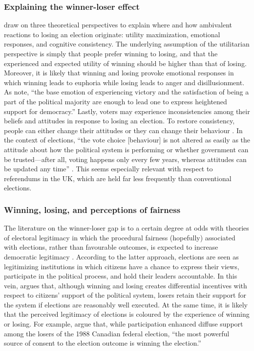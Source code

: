 \documentclass[12pt, letter]{article}
\begin{document}
\subsubsection{Explaining the winner-loser effect}
\textcite{anderson2005losers} draw on three theoretical perspectives to explain where and how ambivalent reactions to losing an election originate: utility maximization, emotional responses, and cognitive consistency. The underlying assumption of the utilitarian perspective is simply that people prefer winning to losing, and that the experienced and expected utility of winning should be higher than that of losing. Moreover, it is likely that winning and losing provoke emotional responses in which winning leads to euphoria while losing leads to anger and disillusionment. As \parencite[697]{singh2011winning} note, ``the base emotion of experiencing victory and the satisfaction of being a part of the political majority are enough to lead one to express heightened support for democracy.''  Lastly, voters may experience inconsistencies among their beliefs and attitudes in response to losing an election. To restore consistency, people can either change their attitudes or they can change their behaviour \parencite{festinger1957theory}. In the context of elections, ``the vote choice [behaviour] is not altered as easily as the attitude about how the political system is performing or whether government can be trusted---after all, voting happens only every few years, whereas attitudes can be updated any time'' \parencite[27]{anderson2005losers}. This seems especially relevant with respect to referendums in the UK, which are held far less frequently than conventional elections. 

\subsubsection{Winning, losing, and perceptions of fairness}

The literature on the winner-loser gap is to a certain degree at odds with theories of electoral legitimacy in which the procedural fairness (hopefully) associated with elections, rather than favourable outcomes, is expected to increase democratic legitimacy \parencite{hooghe2016elections}. According to the latter approach, elections are seen as legitimizing institutions in which citizens have a chance to express their views, participate in the political process, and hold their leaders accountable. In this vein, \textcite{esaiasson2011electoral} argues that, although winning and losing creates differential incentives with respect to citizens' support of the political system, losers retain their support for the system if elections are reasonably well executed. At the same time, it is likely that the perceived legitimacy of elections is coloured by the experience of winning or losing. For example, \textcite{nadeau1993accepting} argue that, while participation enhanced diffuse support among the losers of the 1988 Canadian federal election, ``the most powerful source of consent to the election outcome is winning the election.'' 
\end{document}
